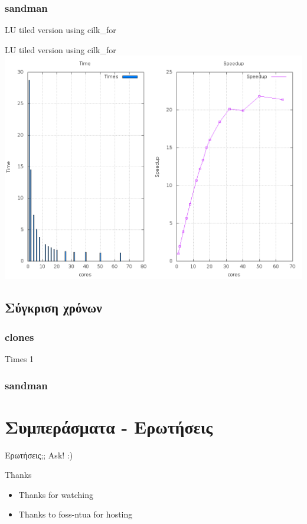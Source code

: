\documentclass{beamer}
\begin{document}
\subsubsection{sandman}
\begin{frame}{LU tiled version using cilk\_for}
    \begin{block}{LU tiled version using cilk\_for}
        \centering
        \includegraphics[scale=0.25]{files/sandman_tiled_cilk_for.png}
    \end{block}
\end{frame}

\subsection{Σύγκριση χρόνων}
\subsubsection{clones}
\begin{frame}
    Times 1
\end{frame}
\subsubsection{sandman}


\section{Συμπεράσματα - Ερωτήσεις}

\begin{frame}{Ερωτήσεις;;}
    Ask! :)
\end{frame}

\begin{frame}[fragile]{Thanks}
    \begin{itemize}
        \item Thanks for watching
        \item Thanks to foss-ntua for hosting
    \end{itemize}
\end{frame}
\end{document}
